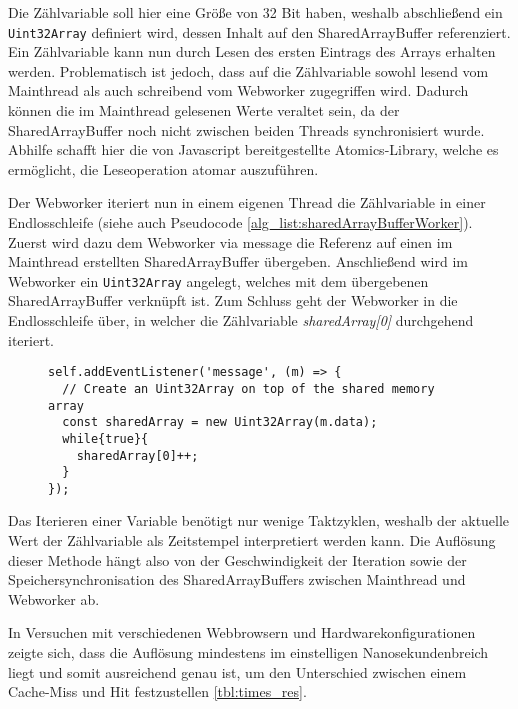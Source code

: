Die Zählvariable soll hier eine Größe von 32 Bit haben, weshalb abschließend ein \lstinline{Uint32Array} definiert wird, dessen Inhalt auf den SharedArrayBuffer referenziert. 
Ein Zählvariable kann nun durch Lesen des ersten Eintrags des Arrays erhalten werden. 
Problematisch ist jedoch, dass auf die Zählvariable sowohl lesend vom Mainthread als auch schreibend vom Webworker zugegriffen wird. 
Dadurch können die im Mainthread gelesenen Werte veraltet sein, da der SharedArrayBuffer noch nicht zwischen beiden Threads synchronisiert wurde. 
Abhilfe schafft hier die von Javascript bereitgestellte Atomics-Library, welche es ermöglicht, die Leseoperation atomar auszuführen.

Der Webworker iteriert nun in einem eigenen Thread die Zählvariable in einer Endlosschleife (siehe auch Pseudocode \ref{alg_list:sharedArrayBufferWorker}). 
Zuerst wird dazu dem Webworker via message die Referenz auf einen im Mainthread erstellten SharedArrayBuffer übergeben.
Anschließend wird im Webworker ein \lstinline{Uint32Array} angelegt, welches mit dem übergebenen SharedArrayBuffer verknüpft ist. 
Zum Schluss geht der Webworker in die Endlosschleife über, in welcher die Zählvariable \textit{sharedArray[0]} durchgehend iteriert.

\begin{figure}[h]
\begin{lstlisting}[caption=counterWebworker.js: Webworker welcher die Zählvariable in einer Endlosschleife iteriert,label=alg_list:sharedArrayBufferWorker]
self.addEventListener('message', (m) => {
  // Create an Uint32Array on top of the shared memory array 
  const sharedArray = new Uint32Array(m.data);
  while{true}{
    sharedArray[0]++;
  }
});
\end{lstlisting}
\end{figure}

Das Iterieren einer Variable benötigt nur wenige Taktzyklen, weshalb der aktuelle Wert der Zählvariable als Zeitstempel interpretiert werden kann. 
Die Auflösung dieser Methode hängt also von der Geschwindigkeit der Iteration sowie der Speichersynchronisation des SharedArrayBuffers zwischen Mainthread und Webworker ab.

In Versuchen mit verschiedenen Webbrowsern und Hardwarekonfigurationen zeigte sich, dass die Auflösung mindestens im einstelligen Nanosekundenbreich liegt und somit ausreichend genau ist, um den Unterschied zwischen einem Cache-Miss und Hit festzustellen \ref{tbl:times_res}.

